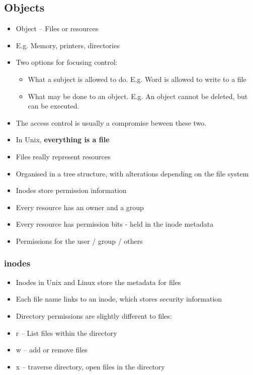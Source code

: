 \documentclass{article}
\begin{document}
\subsection{Objects}
\begin{itemize}
  \item Object – Files or resources 
  \item E.g. Memory, printers, directories 
  \item Two options for focusing control: 
  \begin{itemize}
    \item What a subject is allowed to do. E.g. Word is allowed to write to a file
    \item What may be done to an object. E.g. An object cannot be deleted, but can be executed.
  \end{itemize}
  \item The access control is usually a compromise beween these two.
  \item In Unix, \textbf{everything is a file} 
  \item Files really represent resources 
  \item Organised in a tree structure, with alterations depending on the file system 
  \item Inodes store permission information 
  \item Every resource has an owner and a group
  \item Every resource has permission bits - held in the inode metadata 
  \item Permissions for the user / group / others
\end{itemize}

\subsubsection{inodes}
\begin{itemize}
  \item Inodes in Unix and Linux store the metadata for files 
  \item Each file name links to an inode, which stores security information
  \item Directory permissions are slightly different to files: 
  \item r – List files within the directory 
  \item w – add or remove files 
  \item x – traverse directory, open files in the directory
\end{itemize}
\end{document}
